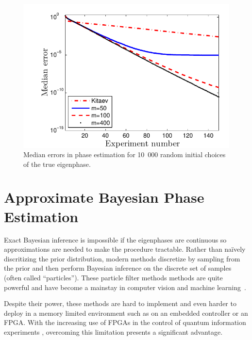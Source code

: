 \documentclass[aps,prl,amsmath,twocolumn,amssymb,superscriptaddress]{revtex4-1}
\begin{document}
\begin{figure}[t!]
    \begin{centering}
        \includegraphics[width=0.8\linewidth]{PEerror.pdf}
    \end{centering}
    \caption{\label{fig:PEerror}
     Median errors in phase estimation for 10~000 random initial choices of the true eigenphase.
    }
\end{figure}





\section{Approximate Bayesian Phase Estimation}

Exact Bayesian inference is impossible if the eigenphases are
continuous so approximations are needed to
make the procedure tractable.  Rather than na\"ively discritizing the prior
distribution, modern methods discretize by sampling from the prior and
then perform Bayesian inference on the discrete set of samples (often called
``particles'').  These particle filter methods methods are quite powerful and
have become a mainstay in computer vision and machine
learning~\cite{haykin2004kalman,smith2013sequential,isard_condensationconditional_1998}.


Despite their power, these methods are hard to implement and even
harder to deploy in a memory limited environment such as on an embedded
controller or an FPGA. With the increasing use of FPGAs in the control of
quantum information experiments
\cite{shulman_suppressing_2014,casagrande_design_2014,hornibrook_cryogenic_2015},
overcoming this limitation presents a
significant advantage. 
\end{document}
